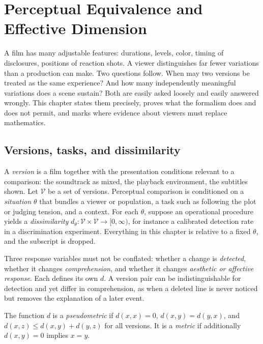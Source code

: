 \chapter{Perceptual Equivalence and Effective Dimension}
\label{ch:equivalence}

A film has many adjustable features: durations, levels, color, timing of disclosures, positions of reaction shots. A viewer distinguishes far fewer variations than a production can make. Two questions follow. When may two versions be treated as the same experience? And how many independently meaningful variations does a scene sustain? Both are easily asked loosely and easily answered wrongly. This chapter states them precisely, proves what the formalism does and does not permit, and marks where evidence about viewers must replace mathematics.

\section{Versions, tasks, and dissimilarity}

A \emph{version} is a film together with the presentation conditions relevant to a comparison: the soundtrack as mixed, the playback environment, the subtitles shown. Let $\mathcal{V}$ be a set of versions. Perceptual comparison is conditioned on a \emph{situation} $\theta$ that bundles a viewer or population, a task such as following the plot or judging tension, and a context. For each $\theta$, suppose an operational procedure yields a \emph{dissimilarity} $d_\theta:\mathcal{V}\times\mathcal{V}\to[0,\infty)$, for instance a calibrated detection rate in a discrimination experiment. Everything in this chapter is relative to a fixed $\theta$, and the subscript is dropped.

Three response variables must not be conflated: whether a change is \emph{detected}, whether it changes \emph{comprehension}, and whether it changes \emph{aesthetic or affective response}. Each defines its own $d$. A version pair can be indistinguishable for detection and yet differ in comprehension, as when a deleted line is never noticed but removes the explanation of a later event.

\begin{definition}
The function $d$ is a \emph{pseudometric} if $d(x,x)=0$, $d(x,y)=d(y,x)$, and $d(x,z)\le d(x,y)+d(y,z)$ for all versions. It is a \emph{metric} if additionally $d(x,y)=0$ implies $x=y$.
\end{definition}

